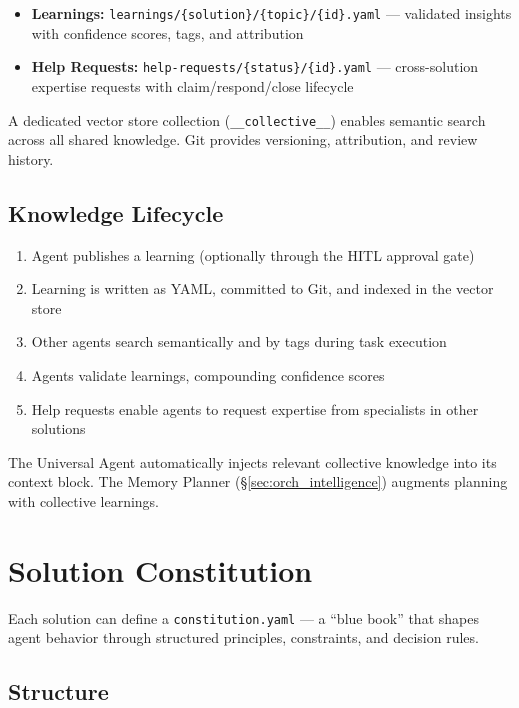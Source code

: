 \documentclass[11pt,a4paper]{article}
\begin{document}
\begin{itemize}[noitemsep]
    \item \textbf{Learnings:} \texttt{learnings/\{solution\}/\{topic\}/\{id\}.yaml} --- validated insights with confidence scores, tags, and attribution
    \item \textbf{Help Requests:} \texttt{help-requests/\{status\}/\{id\}.yaml} --- cross-solution expertise requests with claim/respond/close lifecycle
\end{itemize}

A dedicated vector store collection (\texttt{\_\_collective\_\_}) enables semantic search across all shared knowledge. Git provides versioning, attribution, and review history.

\subsection{Knowledge Lifecycle}

\begin{enumerate}[noitemsep]
    \item Agent publishes a learning (optionally through the HITL approval gate)
    \item Learning is written as YAML, committed to Git, and indexed in the vector store
    \item Other agents search semantically and by tags during task execution
    \item Agents validate learnings, compounding confidence scores
    \item Help requests enable agents to request expertise from specialists in other solutions
\end{enumerate}

The Universal Agent automatically injects relevant collective knowledge into its context block. The Memory Planner (\S\ref{sec:orch_intelligence}) augments planning with collective learnings.

\section{Solution Constitution}
\label{sec:constitution}

Each solution can define a \texttt{constitution.yaml} --- a ``blue book'' that shapes agent behavior through structured principles, constraints, and decision rules.

\subsection{Structure}
\end{document}
